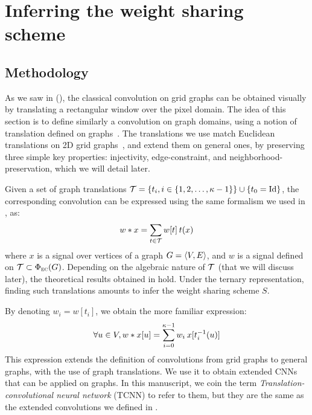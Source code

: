 \section{Inferring the weight sharing scheme}
\label{sec:trans}

\subsection{Methodology}

As we saw in  (), the classical convolution on grid graphs can be obtained visually by translating a rectangular window over the pixel domain. The idea of this section is to define similarly a convolution on graph domains, using a notion of translation defined on graphs~\citep{pasdeloup2017translations}. The translations we use match Euclidean translations on 2D grid graphs~\citep{GrePasViaGri201610}, and extend them on general ones, by preserving three simple key properties: injectivity, edge-constraint, and neighborhood-preservation, which we will detail later.

Given a set of graph translations $\ct = \{t_i, i \in \seq{\kappa - 1}\} \cup \{t_0 = \id \}$, the corresponding convolution can be expressed using the same formalism we used in , as:
\begin{gather}
w \ast x = \displaystyle\sum_{t \in \ct} w[t] \h{2} t(x)
\end{gather}
where $x$ is a signal over vertices of a graph $\gve$, and $w$ is a signal defined on $\ct \subset \Phi_{\EC}(G)$. Depending on the algebraic nature of $\ct$ (that we will discuss later), the theoretical results obtained in  hold. Under the ternary representation, finding such translations amounts to infer the weight sharing scheme $S$.

By denoting $w_i = w[t_i]$, we obtain the more familiar expression:
\begin{gather}
\forall u \in V, w \ast x [u] = \displaystyle\sum_{i=0}^{\kappa-1} w_i \h{2} x[t_i^{-1}(u)]
\end{gather}
This expression extends the definition of convolutions from grid graphs to general graphs, with the use of graph translations. We use it to obtain extended CNNs that can be applied on graphs. In this manuscript, we coin the term \emph{Translation-convolutional neural network} (TCNN) to refer to them, but they are the same as the extended convolutions we defined in \cite{pasdeloup2017convolutional}.

